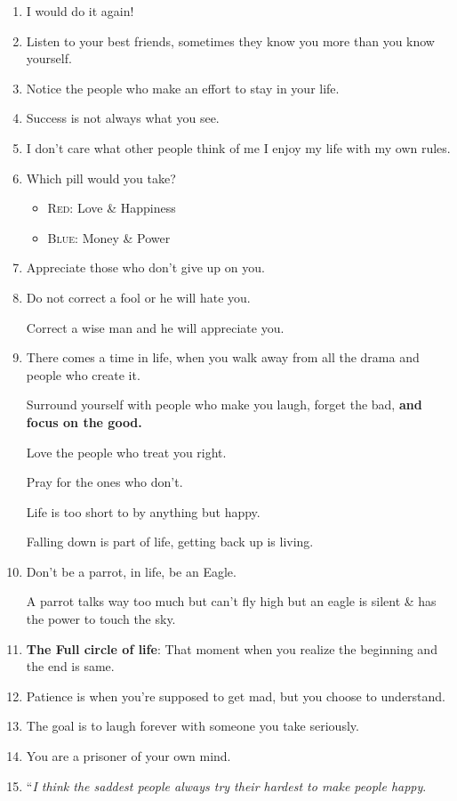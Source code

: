 \documentclass{article}
\numberwithin{equation}{section}
\begin{document}
\begin{enumerate}
\begin{itemize}
        Plan for the future.
        \item Live in the present.
        \item Don't sweat the small stuff.
        \item It's all small stuff.
    \end{itemize}
    \item I would do it again!
    \item Listen to your best friends, sometimes they know you more than you know yourself.
    \item Notice the people who make an effort to stay in your life.
    \item Success is not always what you see.
    \item I don't care what other people think of me I enjoy my life with my own rules.
    \item Which pill would you take?
    \begin{itemize}
        \item \textsc{Red}: Love \& Happiness
        \item \textsc{Blue}: Money \& Power
    \end{itemize}
    \item Appreciate those who don't give up on you.
    \item Do not correct a fool or he will hate you.
    
    Correct a wise man and he will appreciate you.
    \item There comes a time in life, when you walk away from all the drama and people who create it.
    
    Surround yourself with people who make you laugh, forget the bad, \textbf{and focus on the good.}
    
    Love the people who treat you right.
    
    Pray for the ones who don't.
    
    Life is too short to by anything but happy.
    
    Falling down is part of life, getting back up is living.
    \item Don't be a parrot, in life, be an Eagle.
    
    A parrot talks way too much but can't fly high but an eagle is silent \& has the power to touch the sky.
    \item \textbf{The Full circle of life}: That moment when you realize the beginning and the end is same.
    \item Patience is when you're supposed to get mad, but you choose to understand.
    \item The goal is to laugh forever with someone you take seriously.
    \item You are a prisoner of your own mind.
    \item ``\textit{I think the saddest people always try their hardest to make people happy}.
    

\end{enumerate}
\end{document}
